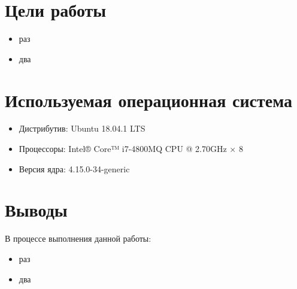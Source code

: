 





\tableofcontents
\newpage

\section{Цели работы}

\begin{itemize}
	\item раз
	\item два
\end{itemize}

\section{Используемая операционная система}

\begin{itemize}
	\item Дистрибутив: Ubuntu 18.04.1 LTS
	\item Процессоры: Intel® Core™ i7-4800MQ CPU @ 2.70GHz × 8
	\item Версия ядра: 4.15.0-34-generic
\end{itemize}

\section{Выводы}

В процессе выполнения данной работы:
\begin{itemize}
	\item раз
	\item два
\end{itemize}



